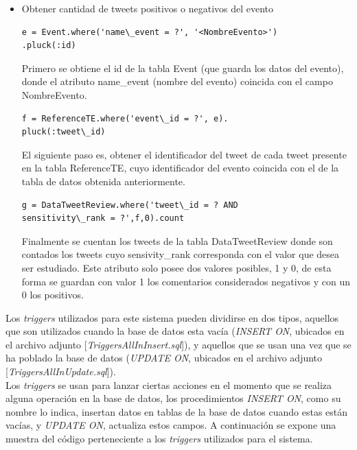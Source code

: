 \documentclass{memoria}
\begin{document}
\begin{itemize}
\item Obtener cantidad de tweets positivos o negativos del evento
\begin{verbatim}
e = Event.where('name\_event = ?', '<NombreEvento>')
.pluck(:id)
\end{verbatim}
Primero se obtiene el id de la tabla Event (que guarda los datos del evento), donde el atributo name\_event (nombre del evento) coincida con el campo NombreEvento.
\begin{verbatim}
f = ReferenceTE.where('event\_id = ?', e).
pluck(:tweet\_id)
\end{verbatim}
El siguiente paso es, obtener el identificador del tweet de cada tweet presente en la tabla ReferenceTE, cuyo identificador del evento coincida con el de la tabla de datos obtenida anteriormente.
\begin{verbatim}
g = DataTweetReview.where('tweet\_id = ? AND 
sensitivity\_rank = ?',f,0).count
\end{verbatim}
Finalmente se cuentan los tweets de la tabla DataTweetReview donde son contados los tweets cuyo sensivity\_rank corresponda con el valor que desea ser estudiado. Este atributo solo posee dos valores posibles, 1 y 0, de esta forma se guardan con valor 1 los comentarios considerados negativos y con un 0 los positivos.
\end{itemize}


Los \textit{triggers} utilizados para este sistema pueden dividirse en dos tipos, aquellos que son utilizados cuando la base de datos esta vacía (\textit{INSERT ON}, ubicados en el archivo adjunto [\textit{TriggersAllInInsert.sql}]), y aquellos que se usan una vez que se ha poblado la base de datos (\textit{UPDATE ON}, ubicados en el archivo adjunto [\textit{TriggersAllInUpdate.sql}]).\\ 
Los \textit{triggers} se usan para lanzar ciertas acciones en el momento que se realiza alguna operación en la base de datos, los procedimientos \textit{INSERT ON}, como su nombre lo indica, insertan datos en tablas de la base de datos cuando estas están vacías, y \textit{UPDATE ON}, actualiza estos campos. A continuación se expone una muestra del código perteneciente a los \textit{triggers} utilizados para el sistema.
\end{document}
